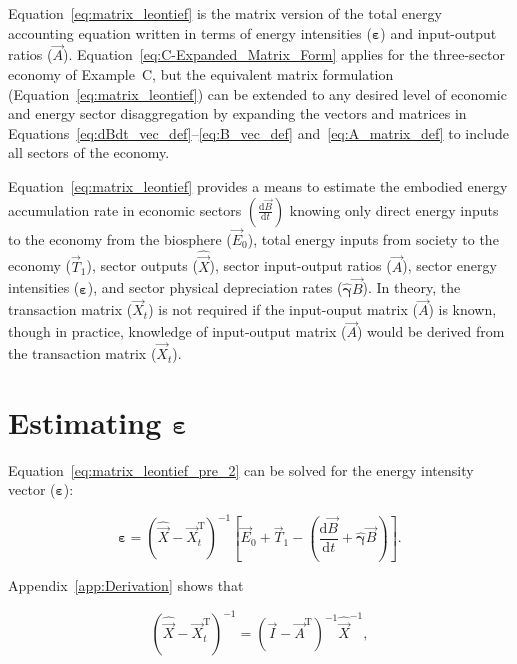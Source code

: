 \noindent{}Equation~\ref{eq:matrix_leontief} is the matrix version 
of the total energy accounting equation
written in terms of energy intensities ($\bm{\varepsilon}$)
and input-output ratios ($\vec{A}$).
Equation~\ref{eq:C-Expanded_Matrix_Form} applies 
for the three-sector economy of Example~C, 
but the equivalent matrix formulation (Equation~\ref{eq:matrix_leontief}) 
can be extended to any desired level 
of economic and energy sector disaggregation 
by expanding the vectors and matrices in 
Equations~\ref{eq:dBdt_vec_def}--\ref{eq:B_vec_def}
and~\ref{eq:A_matrix_def} to include
all sectors of the economy.\cite{Casler1984,Bullard1976a}

Equation~\ref{eq:matrix_leontief} provides a means to 
estimate the embodied energy accumulation rate
in economic sectors $\left(\frac{\mathrm{d}\vec{B}}{\mathrm{d}t}\right)$ 
knowing only 
direct energy inputs to the economy from the biosphere ($\vec{E}_{0}$), 
total energy inputs from society to the economy ($\vec{T}_{1}$),
sector outputs ($\hat{\vec{X}}$), 
sector input-output ratios ($\vec{A}$), 
sector energy intensities ($\bm{\varepsilon}$), 
and sector physical depreciation rates ($\hat{\bm{\gamma}}\vec{B}$). 
In theory, the transaction matrix ($\vec{X}_{t}$) is not required 
if the input-ouput matrix ($\vec{A}$) is known, 
though in practice, knowledge of input-output matrix ($\vec{A}$) 
would be derived from the transaction matrix ($\vec{X}_{t}$).


\section{Estimating $\bm{\varepsilon}$}

Equation~\ref{eq:matrix_leontief_pre_2} can be solved 
for the energy intensity vector ($\bm{\varepsilon}$):

\begin{equation} \label{eq:epsilon_leontief}
	\bm{\varepsilon} 
	= {(\hat{\vec{X}} - \vec{X}_{t}^{\mathrm{T}})}^{-1}
		\left[\vec{E}_{0}
			 	+ \vec{T}_{1}
				- \left(\frac{\mathrm{d}\vec{B}}{\mathrm{d}t} 
				+ \hat{\bm{\gamma}}\vec{B}\right)
		\right].
\end{equation}

\noindent{}Appendix~\ref{app:Derivation} shows that 

\begin{equation} \label{eq:Xdifference2_inverse}
	{\left(
		\hat{\vec{X}} 
		- \vec{X}_{t}^{\mathrm{T}}
		\right)}^{-1} 
	= {(\vec{I} - \vec{A}^{\mathrm{T}})}^{-1}\hat{\vec{X}}^{-1},
\end{equation}

